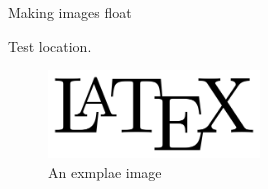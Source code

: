 \documentclass[a4paper]{article}
\begin{document}
Making images float



\lipsum[1-3]

Test location.
\begin{figure}[ht]
    \centering %
    \includegraphics[width=0.5\textwidth]{LaTeX_logo.svg.png} %
    \caption{An exmplae image}
\end{figure}



\lipsum[4-8]
\end{document}
